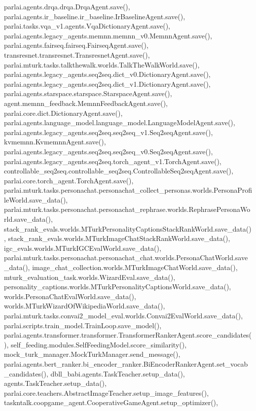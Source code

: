 parlai.\+agents.\+drqa.\+drqa.\+Drqa\+Agent.\+save(), parlai.\+agents.\+ir\+\_\+baseline.\+ir\+\_\+baseline.\+Ir\+Baseline\+Agent.\+save(), parlai.\+tasks.\+vqa\+\_\+v1.\+agents.\+Vqa\+Dictionary\+Agent.\+save(), parlai.\+agents.\+legacy\+\_\+agents.\+memnn.\+memnn\+\_\+v0.\+Memnn\+Agent.\+save(), parlai.\+agents.\+fairseq.\+fairseq.\+Fairseq\+Agent.\+save(), transresnet.\+transresnet.\+Transresnet\+Agent.\+save(), parlai.\+mturk.\+tasks.\+talkthewalk.\+worlds.\+Talk\+The\+Walk\+World.\+save(), parlai.\+agents.\+legacy\+\_\+agents.\+seq2seq.\+dict\+\_\+v0.\+Dictionary\+Agent.\+save(), parlai.\+agents.\+legacy\+\_\+agents.\+seq2seq.\+dict\+\_\+v1.\+Dictionary\+Agent.\+save(), parlai.\+agents.\+starspace.\+starspace.\+Starspace\+Agent.\+save(), agent.\+memnn\+\_\+feedback.\+Memnn\+Feedback\+Agent.\+save(), parlai.\+core.\+dict.\+Dictionary\+Agent.\+save(), parlai.\+agents.\+language\+\_\+model.\+language\+\_\+model.\+Language\+Model\+Agent.\+save(), parlai.\+agents.\+legacy\+\_\+agents.\+seq2seq.\+seq2seq\+\_\+v1.\+Seq2seq\+Agent.\+save(), kvmemnn.\+Kvmemnn\+Agent.\+save(), parlai.\+agents.\+legacy\+\_\+agents.\+seq2seq.\+seq2seq\+\_\+v0.\+Seq2seq\+Agent.\+save(), parlai.\+agents.\+legacy\+\_\+agents.\+seq2seq.\+torch\+\_\+agent\+\_\+v1.\+Torch\+Agent.\+save(), controllable\+\_\+seq2seq.\+controllable\+\_\+seq2seq.\+Controllable\+Seq2seq\+Agent.\+save(), parlai.\+core.\+torch\+\_\+agent.\+Torch\+Agent.\+save(), parlai.\+mturk.\+tasks.\+personachat.\+personachat\+\_\+collect\+\_\+personas.\+worlds.\+Persona\+Profile\+World.\+save\+\_\+data(), parlai.\+mturk.\+tasks.\+personachat.\+personachat\+\_\+rephrase.\+worlds.\+Rephrase\+Persona\+World.\+save\+\_\+data(), stack\+\_\+rank\+\_\+evals.\+worlds.\+M\+Turk\+Personality\+Captions\+Stack\+Rank\+World.\+save\+\_\+data(), stack\+\_\+rank\+\_\+evals.\+worlds.\+M\+Turk\+Image\+Chat\+Stack\+Rank\+World.\+save\+\_\+data(), igc\+\_\+evals.\+worlds.\+M\+Turk\+I\+G\+C\+Eval\+World.\+save\+\_\+data(), parlai.\+mturk.\+tasks.\+personachat.\+personachat\+\_\+chat.\+worlds.\+Persona\+Chat\+World.\+save\+\_\+data(), image\+\_\+chat\+\_\+collection.\+worlds.\+M\+Turk\+Image\+Chat\+World.\+save\+\_\+data(), mturk\+\_\+evaluation\+\_\+task.\+worlds.\+Wizard\+Eval.\+save\+\_\+data(), personality\+\_\+captions.\+worlds.\+M\+Turk\+Personality\+Captions\+World.\+save\+\_\+data(), worlds.\+Persona\+Chat\+Eval\+World.\+save\+\_\+data(), worlds.\+M\+Turk\+Wizard\+Of\+Wikipedia\+World.\+save\+\_\+data(), parlai.\+mturk.\+tasks.\+convai2\+\_\+model\+\_\+eval.\+worlds.\+Convai2\+Eval\+World.\+save\+\_\+data(), parlai.\+scripts.\+train\+\_\+model.\+Train\+Loop.\+save\+\_\+model(), parlai.\+agents.\+transformer.\+transformer.\+Transformer\+Ranker\+Agent.\+score\+\_\+candidates(), self\+\_\+feeding.\+modules.\+Self\+Feeding\+Model.\+score\+\_\+similarity(), mock\+\_\+turk\+\_\+manager.\+Mock\+Turk\+Manager.\+send\+\_\+message(), parlai.\+agents.\+bert\+\_\+ranker.\+bi\+\_\+encoder\+\_\+ranker.\+Bi\+Encoder\+Ranker\+Agent.\+set\+\_\+vocab\+\_\+candidates(), dbll\+\_\+babi.\+agents.\+Task\+Teacher.\+setup\+\_\+data(), agents.\+Task\+Teacher.\+setup\+\_\+data(), parlai.\+core.\+teachers.\+Abstract\+Image\+Teacher.\+setup\+\_\+image\+\_\+features(), taskntalk.\+coopgame\+\_\+agent.\+Cooperative\+Game\+Agent.\+setup\+\_\+optimizer(), 